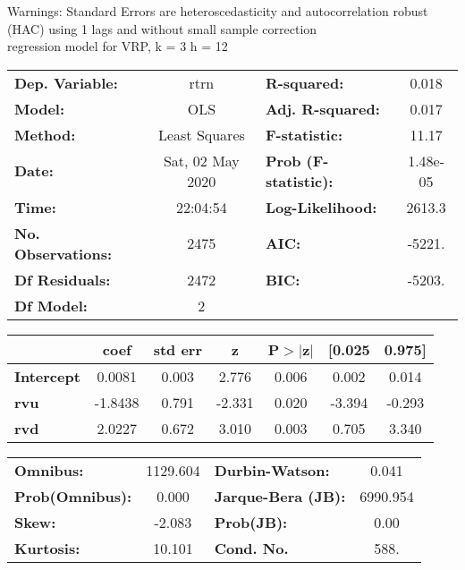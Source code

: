Warnings: \newline
 [1] Standard Errors are heteroscedasticity and autocorrelation robust (HAC) using 1 lags and without small sample correction\\ 

regression model for VRP, k = 3 h = 12\begin{center}
\begin{tabular}{lclc}
\toprule
\textbf{Dep. Variable:}    &       rtrn       & \textbf{  R-squared:         } &     0.018   \\
\textbf{Model:}            &       OLS        & \textbf{  Adj. R-squared:    } &     0.017   \\
\textbf{Method:}           &  Least Squares   & \textbf{  F-statistic:       } &     11.17   \\
\textbf{Date:}             & Sat, 02 May 2020 & \textbf{  Prob (F-statistic):} &  1.48e-05   \\
\textbf{Time:}             &     22:04:54     & \textbf{  Log-Likelihood:    } &    2613.3   \\
\textbf{No. Observations:} &        2475      & \textbf{  AIC:               } &    -5221.   \\
\textbf{Df Residuals:}     &        2472      & \textbf{  BIC:               } &    -5203.   \\
\textbf{Df Model:}         &           2      & \textbf{                     } &             \\
\bottomrule
\end{tabular}
\begin{tabular}{lcccccc}
                   & \textbf{coef} & \textbf{std err} & \textbf{z} & \textbf{P$> |$z$|$} & \textbf{[0.025} & \textbf{0.975]}  \\
\midrule
\textbf{Intercept} &       0.0081  &        0.003     &     2.776  &         0.006        &        0.002    &        0.014     \\
\textbf{rvu}       &      -1.8438  &        0.791     &    -2.331  &         0.020        &       -3.394    &       -0.293     \\
\textbf{rvd}       &       2.0227  &        0.672     &     3.010  &         0.003        &        0.705    &        3.340     \\
\bottomrule
\end{tabular}
\begin{tabular}{lclc}
\textbf{Omnibus:}       & 1129.604 & \textbf{  Durbin-Watson:     } &    0.041  \\
\textbf{Prob(Omnibus):} &   0.000  & \textbf{  Jarque-Bera (JB):  } & 6990.954  \\
\textbf{Skew:}          &  -2.083  & \textbf{  Prob(JB):          } &     0.00  \\
\textbf{Kurtosis:}      &  10.101  & \textbf{  Cond. No.          } &     588.  \\
\bottomrule
\end{tabular}
\end{center}

